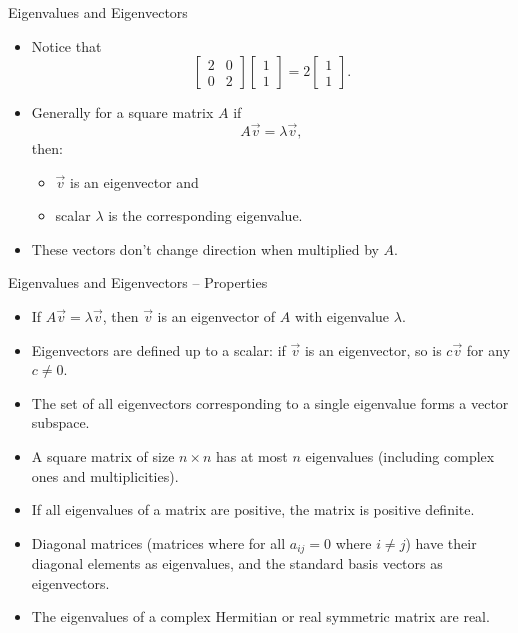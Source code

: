 \documentclass{beamer}
\begin{document}
\begin{frame}{Eigenvalues and Eigenvectors}
  \begin{itemize}
    \item Notice that 
    \begin{equation}
        \begin{bmatrix} 2 & 0 \\ 0 & 2 \end{bmatrix}\begin{bmatrix} 1 \\ 1 \end{bmatrix} = 2\begin{bmatrix} 1 \\ 1 \end{bmatrix}. 
    \end{equation}
    \item Generally for a square matrix \(A\) if
    \begin{equation}
        A\vec{v} = \lambda \vec{v},
    \end{equation}
    then:
    \begin{itemize}
      \item $\vec{v}$ is an eigenvector and
      \item scalar $\lambda$ is the corresponding eigenvalue.
    \end{itemize}
    \item These vectors don't change direction when multiplied by $A$.
  \end{itemize}
\end{frame}

\begin{frame}{Eigenvalues and Eigenvectors – Properties}
  \begin{itemize}
    \item If $A \vec{v} = \lambda \vec{v}$, then $\vec{v}$ is an eigenvector of $A$ with eigenvalue $\lambda$.
    \item Eigenvectors are defined up to a scalar: if $\vec{v}$ is an eigenvector, so is $c\vec{v}$ for any $c \neq 0$.
    \item The set of all eigenvectors corresponding to a single eigenvalue forms a vector subspace.
    \item A square matrix of size $n \times n$ has at most $n$ eigenvalues (including complex ones and multiplicities).
    \item If all eigenvalues of a matrix are positive, the matrix is positive definite.
    \item Diagonal matrices (matrices where for all $a_{ij}=0$ where $i\neq j$) have their diagonal elements as eigenvalues, and the standard basis vectors as eigenvectors.
    \item The eigenvalues of a complex Hermitian or real symmetric matrix are real.
  \end{itemize}
\end{frame}
\end{document}
